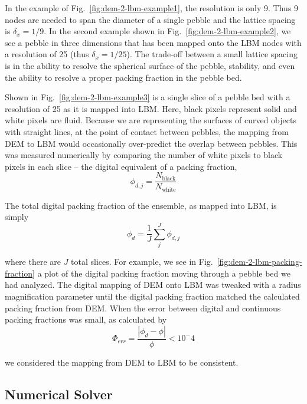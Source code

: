 In the example of Fig.~\ref{fig:dem-2-lbm-example1}, the resolution is only 9. Thus 9 nodes are needed to span the diameter of a single pebble and the lattice spacing is $\delta_x = 1/9$. In the second example shown in Fig.~\ref{fig:dem-2-lbm-example2}, we see a pebble in three dimensions that has been mapped onto the LBM nodes with a resolution of 25 (thus $\delta_x = 1/25$). The trade-off between a small lattice spacing is in the ability to resolve the spherical surface of the pebble, stability, and even the ability to resolve a proper packing fraction in the pebble bed. 

Shown in Fig.~\ref{fig:dem-2-lbm-example3} is a single slice of a pebble bed with a resolution of 25 as it is mapped into LBM. Here, black pixels represent solid and white pixels are fluid. Because we are representing the surfaces of curved objects with straight lines, at the point of contact between pebbles, the mapping from DEM to LBM would occasionally over-predict the overlap between pebbles. This was measured numerically by comparing the number of white pixels to black pixels in each slice -- the digital equivalent of a packing fraction,
\begin{equation}
	\phi_{d,j} = \frac{N_\text{black}}{N_\text{white}}
\end{equation}

The total digital packing fraction of the ensemble, as mapped into LBM, is simply
\begin{equation}
	\phi_d = \frac{1}{J}\sum_j^J\phi_{d,j}
\end{equation}

where there are $J$ total slices. For example, we see in Fig.~\ref{fig:dem-2-lbm-packing-fraction} a plot of the digital packing fraction moving through a pebble bed we had analyzed. The digital mapping of DEM onto LBM was tweaked with a radius magnification parameter until the digital packing fraction matched the calculated packing fraction from DEM. When the error between digital and continuous packing fractions was small, as calculated by
\begin{equation}
	\Phi_{err} = \frac{|\phi_d - \phi|}{\phi} < 10^-4
\end{equation}

we considered the mapping from DEM to LBM to be consistent.



\subsection{Numerical Solver}

